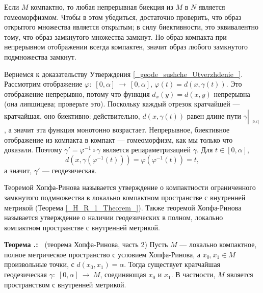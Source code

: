 \documentclass[12pt]{book}
\newcommand{\arrow}{{\:\longrightarrow\:}}
\newcommand{\restrict}[1]{{\left|_{{\phantom{|}\!\!}_{#1}}\right.}}
\renewcommand{\phi}{\varphi}
\theoremstyle{upshape}
\theoremstyle{generic}
\theoremstyle{upshapenonumber}
\newcommand{\следствие}{%
     \refstepcounter{teorema}
     {\noindent\bf Следствие \thechapter.\arabic{teorema}:\ }}
\newcommand{\пример}{%
     \refstepcounter{teorema}
     {\noindent\bf Пример \thechapter.\arabic{teorema}:\ }}
\newcommand{\лемма}{%
     \refstepcounter{teorema}
     {\noindent\bf Лемма \thechapter.\arabic{teorema}:\ }}
\newcommand{\теорема}{%
     \refstepcounter{teorema}
     {\noindent\bf Теорема \thechapter.\arabic{teorema}:\ }}
\newcommand{\утверждение}{%
     \refstepcounter{teorema}
     {\noindent\bf Утверждение \thechapter.\arabic{teorema}:\ }}
\def\хфилл{\hfill}
\begin{document}
\hfill

Если $M$ компактно, то любая непрерывная биекция
из $M$ в $N$ является гомеоморфизмом. Чтобы в этом
убедиться, достаточно проверить, что образ открытого
множества является открытым; в силу биективности, 
это эквивалентно тому, что образ замкнутого множества
замкнут. Но образ компакта при непрерывном отображении
всегда компактен, значит образ любого замкнутого подмножества
замкнут.

\хфилл

Вернемся к доказательству Утверждения \ref{_geode_sushche_Utverzhdenie_}.
Рассмотрим отображение $\phi:\; [0,\alpha]\arrow [0,\alpha]$,
$\phi(t)= d(x, \gamma(t))$. Это отображение непрерывно,
потому что функция $d_x(y) = d(x,y)$ непрерывна
(она липшицева; проверьте это). Поскольку каждый
отрезок кратчайшей --- кратчайшая, оно биективно:
действительно, $d(x, \gamma(t))$ равен длине пути
$\gamma\restrict{[0,t]}$, а значит эта функция
монотонно возрастает. Непрерывное, биективное
отображение из компакта в компакт --- гомеоморфизм,
как мы только что доказали. Поэтому 
$\gamma' =\phi^{-1}\circ\gamma$ является репараметризацией
$\gamma$. Для $t\in [0,\alpha]$,
\[ 
   d(x, \gamma(\phi^{-1}(t)))=\phi(\phi^{-1}(t))=t,
\]
а значит, $\gamma'$ --- геодезическая. 

Теоремой Хопфа-Ринова называется утверждение
о компактности ограниченного замкнутого подмножества в
локально компактном пространстве с внутренней метрикой
(Теорема \ref{_H_R_1_Theorem_}). Также теоремой
Хопфа-Ринова называется утверждение о наличии геодезических 
в полном, локально компактном пространстве с внутренней
метрикой.

\хфилл

\теорема
\label{_H_R_2_Theorem_}
(теорема Хопфа-Ринова, часть 2)
Пусть $M$ --- локально компактное, полное метрическое пространство
с условием Хопфа-Ринова, а $x_0, x_1\in M$ произвольные точки,
с $d(x_0, x_1)=\alpha$. Тогда существует кратчайшая геодезическая
$\gamma:\; [0,\alpha]\arrow M$, соединяющая $x_0$ и $x_1$.
В частности, $M$ является пространством с внутренней метрикой.

\хфилл
\end{document}
